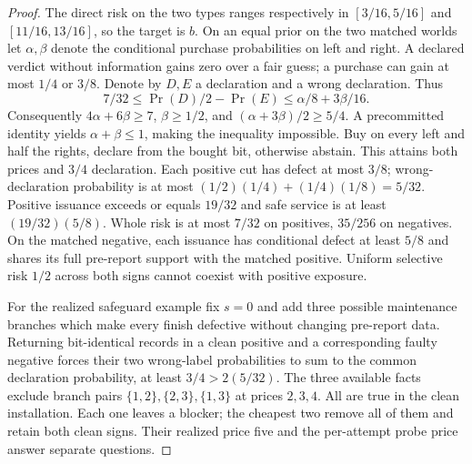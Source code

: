 \begin{proof}
The direct risk on the two types ranges respectively in \([3/16,5/16]\) and \([11/16,13/16]\), so the target is \(b\). On an equal prior on the two matched worlds let \(\alpha,\beta\) denote the conditional purchase probabilities on left and right. A declared verdict without information gains zero over a fair guess; a purchase can gain at most \(1/4\) or \(3/8\). Denote by \(D,E\) a declaration and a wrong declaration. Thus
\[
 7/32\le\Pr(D)/2-\Pr(E)\le\alpha/8+3\beta/16.
\]
Consequently \(4\alpha+6\beta\ge7\), \(\beta\ge1/2\), and \((\alpha+3\beta)/2\ge5/4\). A precommitted identity yields \(\alpha+\beta\le1\), making the inequality impossible. Buy on every left and half the rights, declare from the bought bit, otherwise abstain. This attains both prices and \(3/4\) declaration. Each positive cut has defect at most \(3/8\); wrong-declaration probability is at most \((1/2)(1/4)+(1/4)(1/8)=5/32\). Positive issuance exceeds or equals \(19/32\) and safe service is at least \((19/32)(5/8)\). Whole risk is at most \(7/32\) on positives, \(35/256\) on negatives. On the matched negative, each issuance has conditional defect at least \(5/8\) and shares its full pre-report support with the matched positive. Uniform selective risk \(1/2\) across both signs cannot coexist with positive exposure.

For the realized safeguard example fix \(s=0\) and add three possible maintenance branches which make every finish defective without changing pre-report data. Returning bit-identical records in a clean positive and a corresponding faulty negative forces their two wrong-label probabilities to sum to the common declaration probability, at least \(3/4>2(5/32)\). The three available facts exclude branch pairs \(\{1,2\},\{2,3\},\{1,3\}\) at prices \(2,3,4\). All are true in the clean installation. Each one leaves a blocker; the cheapest two remove all of them and retain both clean signs. Their realized price five and the per-attempt probe price answer separate questions.
\end{proof}
